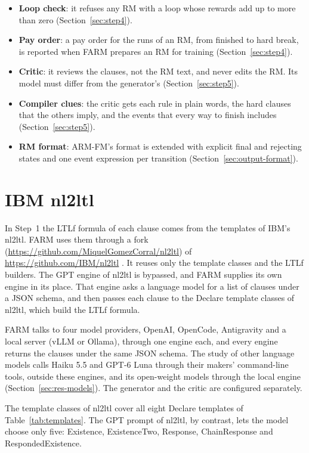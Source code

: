 \documentclass[11pt,english,listoffigures,listoftables]{tfgetsinf}
\begin{document}
\begin{itemize}
    \item \textbf{Loop check}: it refuses any RM with a loop whose rewards add up to more than zero (Section~\ref{sec:step4}).
    \item \textbf{Pay order}: a pay order for the runs of an RM, from finished to hard break, is reported when FARM prepares an RM for training (Section~\ref{sec:step4}).
    \item \textbf{Critic}: it reviews the clauses, not the RM text, and never edits the RM. Its model must differ from the generator's (Section~\ref{sec:step5}).
    \item \textbf{Compiler clues}: the critic gets each rule in plain words, the hard clauses that the others imply, and the events that every way to finish includes (Section~\ref{sec:step5}).
    \item \textbf{RM format}: ARM-FM's format is extended with explicit final and rejecting states and one event expression per transition (Section~\ref{sec:output-format}).
\end{itemize}

\section{IBM nl2ltl}
In Step~1 the LTLf formula of each clause comes from the templates of IBM's nl2ltl. FARM uses them through a fork (\url{https://github.com/MiquelGomezCorral/nl2ltl}) of \url{https://github.com/IBM/nl2ltl} \cite{nl2ltl_code}. It reuses only the template classes and the LTLf builders. The GPT engine of nl2ltl is bypassed, and FARM supplies its own engine in its place. That engine asks a language model for a list of clauses under a JSON schema, and then passes each clause to the Declare template classes of nl2ltl, which build the LTLf formula.

FARM talks to four model providers, OpenAI, OpenCode, Antigravity and a local server (vLLM or Ollama), through one engine each, and every engine returns the clauses under the same JSON schema. The study of other language models calls Haiku 5.5 and GPT-6 Luna through their makers' command-line tools, outside these engines, and its open-weight models through the local engine (Section~\ref{sec:res-models}). The generator and the critic are configured separately.

The template classes of nl2ltl cover all eight Declare templates of Table~\ref{tab:templates}. The GPT prompt of nl2ltl, by contrast, lets the model choose only five: Existence, ExistenceTwo, Response, \mbox{ChainResponse} and RespondedExistence.
\end{document}
